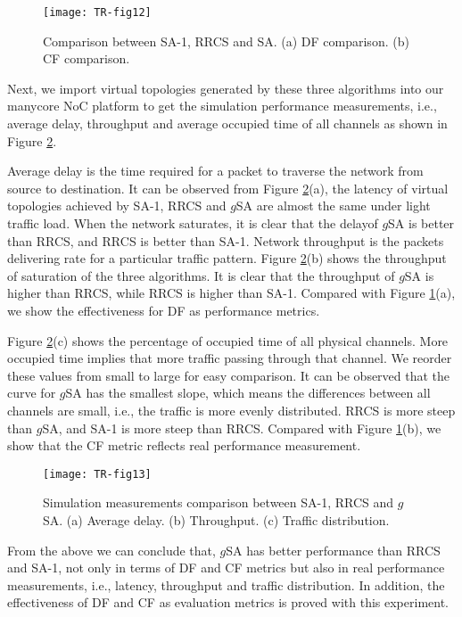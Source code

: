 \begin{figure}[h]
      \centering
        \texttt{[image: TR-fig12]}
          \caption{ Comparison between SA-1, RRCS and SA. (a) DF comparison. (b) CF comparison.}
        \label{fig12}
\end{figure}


Next, we import virtual topologies generated by these three algorithms into our manycore NoC platform to get the simulation performance measurements, i.e., average delay, throughput and average occupied time of all channels as shown in Figure \ref{fig13}. 

Average delay is the time required for a packet to traverse the network from source to destination. It can be observed from Figure \ref{fig13}(a), the latency of virtual topologies achieved by SA-1, RRCS and $g$SA are almost the same under light traffic load. When the network saturates, it is clear that the delayof $g$SA is better than RRCS, and RRCS is better than SA-1. Network throughput is the packets delivering rate for a particular traffic pattern. Figure \ref{fig13}(b) shows the throughput of saturation of the three algorithms. It is clear that the throughput of $g$SA is higher than RRCS, while RRCS is higher than SA-1. Compared with Figure \ref{fig12}(a), we show the effectiveness for DF as performance metrics.

Figure \ref{fig13}(c) shows the percentage of occupied time of all physical channels. More occupied time implies that more traffic passing through that channel. We reorder these values from small to large for easy comparison. It can be observed that the curve for $g$SA has the smallest slope, which means the differences between all channels are small, i.e., the traffic is more evenly distributed. RRCS is more steep than $g$SA, and SA-1 is more steep than RRCS. Compared with Figure \ref{fig12}(b), we show that the CF metric reflects real performance measurement.

\begin{figure}[h]
      \centering
        \texttt{[image: TR-fig13]}
        \caption{ Simulation measurements comparison between SA-1, RRCS and $g$SA. (a) Average delay. (b) Throughput. (c) Traffic distribution.}
        \label{fig13}
\end{figure}

From the above we can conclude that, $g$SA has better performance than RRCS and SA-1, not only in terms of DF and CF metrics but also in real performance measurements, i.e., latency, throughput and traffic distribution. In addition, the effectiveness of DF and CF as evaluation metrics is proved with this experiment.

